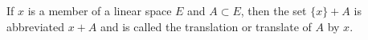If $x$ is a member of a linear space $E$ and $A \subset E$, then the set $\{x\} + A$ is abbreviated $x + A$ and is called the translation or translate of $A$ by $x$.
